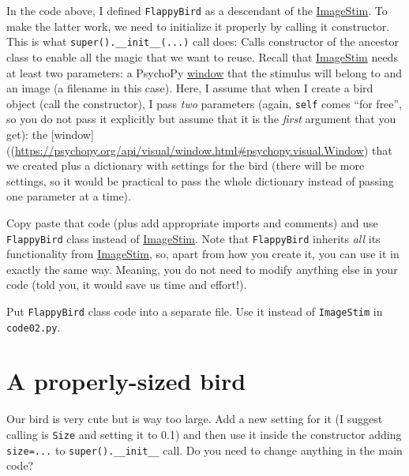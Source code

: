 \documentclass[
]{book}
\begin{document}
In the code above, I defined \texttt{FlappyBird} as a descendant of the \href{https://psychopy.org/api/visual/imagestim.html\#psychopy.visual.ImageStim}{ImageStim}. To make the latter work, we need to initialize it properly by calling it constructor. This is what \texttt{super().\_\_init\_\_(...)} call does: Calls constructor of the ancestor class to enable all the magic that we want to reuse. Recall that \href{https://psychopy.org/api/visual/imagestim.html\#psychopy.visual.ImageStim}{ImageStim} needs at least two parameters: a PsychoPy \href{(https://psychopy.org/api/visual/window.html\#psychopy.visual.Window)}{window} that the stimulus will belong to and an image (a filename in this case). Here, I assume that when I create a bird object (call the constructor), I pass \emph{two} parameters (again, \texttt{self} comes ``for free'', so you do not pass it explicitly but assume that it is the \emph{first} argument that you get): the {[}window{]}((\url{https://psychopy.org/api/visual/window.html\#psychopy.visual.Window}) that we created plus a dictionary with settings for the bird (there will be more settings, so it would be practical to pass the whole dictionary instead of passing one parameter at a time).

Copy paste that code (plus add appropriate imports and comments) and use \texttt{FlappyBird} class instead of \href{https://psychopy.org/api/visual/imagestim.html\#psychopy.visual.ImageStim}{ImageStim}. Note that \texttt{FlappyBird} inherits \emph{all} its functionality from \href{https://psychopy.org/api/visual/imagestim.html\#psychopy.visual.ImageStim}{ImageStim}, so, apart from how you create it, you can use it in exactly the same way. Meaning, you do not need to modify anything else in your code (told you, it would save us time and effort!).

Put \texttt{FlappyBird} class code into a separate file.
Use it instead of \texttt{ImageStim} in \texttt{code02.py}.

\hypertarget{a-properly-sized-bird}{%
\section{A properly-sized bird}\label{a-properly-sized-bird}}

Our bird is very cute but is way too large. Add a new setting for it (I suggest calling is \texttt{Size} and setting it to 0.1) and then use it inside the constructor adding \texttt{size=...} to \texttt{super().\_\_init\_\_} call. Do you need to change anything in the main code?
\end{document}
